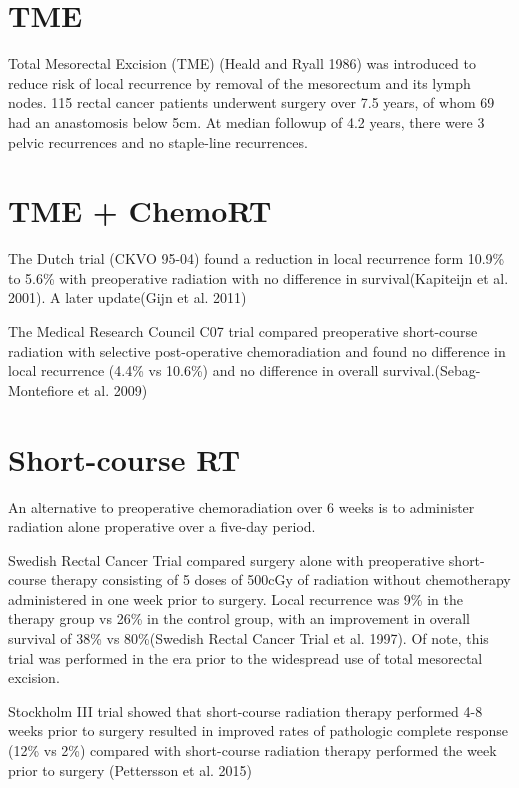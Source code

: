 \documentclass[
  letterpaper,
]{scrbook}
\begin{document}
\section{TME}\label{tme}

Total Mesorectal Excision (TME) (Heald and Ryall 1986) was introduced to
reduce risk of local recurrence by removal of the mesorectum and its
lymph nodes. 115 rectal cancer patients underwent surgery over 7.5
years, of whom 69 had an anastomosis below 5cm. At median followup of
4.2 years, there were 3 pelvic recurrences and no staple-line
recurrences.

\section{TME + ChemoRT}\label{tme-chemort}

The Dutch trial (CKVO 95-04) found a reduction in local recurrence form
10.9\% to 5.6\% with preoperative radiation with no difference in
survival(Kapiteijn et al. 2001). A later update(Gijn et al. 2011)

The Medical Research Council C07 trial compared preoperative
short-course radiation with selective post-operative chemoradiation and
found no difference in local recurrence (4.4\% vs 10.6\%) and no
difference in overall survival.(Sebag-Montefiore et al. 2009)

\section{Short-course RT}\label{short-course-rt}

An alternative to preoperative chemoradiation over 6 weeks is to
administer radiation alone properative over a five-day period.

Swedish Rectal Cancer Trial compared surgery alone with preoperative
short-course therapy consisting of 5 doses of 500cGy of radiation
without chemotherapy administered in one week prior to surgery. Local
recurrence was 9\% in the therapy group vs 26\% in the control group,
with an improvement in overall survival of 38\% vs 80\%(Swedish Rectal
Cancer Trial et al. 1997). Of note, this trial was performed in the era
prior to the widespread use of total mesorectal excision.

Stockholm III trial showed that short-course radiation therapy performed
4-8 weeks prior to surgery resulted in improved rates of pathologic
complete response (12\% vs 2\%) compared with short-course radiation
therapy performed the week prior to surgery (Pettersson et al. 2015)
\end{document}
